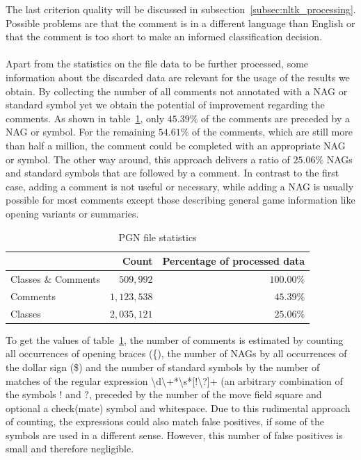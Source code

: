 \documentclass[article,type=msc,colorback,accentcolor=tud7b]{tudthesis}
\begin{document}
    The last criterion quality will be discussed in subsection~\ref{subsec:nltk_processing}. Possible problems are that the comment is in a different language than English or that the comment is too short to make an informed classification decision. \\\\
    Apart from the statistics on the file data to be further processed, some information about the discarded data are relevant for the usage of the results we obtain. By collecting the number of all comments not annotated with a NAG or standard symbol yet we obtain the potential of improvement regarding the comments. As shown in table~\ref{tab:file_statistics}, only $45.39\%$ of the comments are preceded by a NAG or symbol. For the remaining $54.61\%$ of the comments, which are still more than half a million, the comment could be completed with an appropriate NAG or symbol. The other way around, this approach delivers a ratio of $25.06\%$ NAGs and standard symbols that are followed by a comment. In contrast to the first case, adding a comment is not useful or necessary, while adding a NAG is usually possible for most comments except those describing general game information like opening variants or summaries.
	
	\begin{table}[H]
      \begin{tabular}{| l | r | r |}
    	\hline
    	 & Count & Percentage of processed data \\ \hline
    	Classes \& Comments & $509,992$ & $100.00\%$ \\ \hline
    	Comments & $1,123,538$ & $45.39\%$ \\ \hline
    	Classes & $2,035,121$ & $25.06\%$ \\ \hline
      \end{tabular}
      \caption{PGN file statistics}
      \label{tab:file_statistics}
	\end{table}
	
    To get the values of table~\ref{tab:file_statistics}, the number of comments is estimated by counting all occurrences of opening braces (\{), the number of NAGs by all occurrences of the dollar sign (\$) and the number of standard symbols by the number of matches of the regular expression \textbackslash d\textbackslash+*\textbackslash s*[!\textbackslash?]+ (an arbitrary combination of the symbols $!$ and $?$, preceded by the number of the move field square and optional a check(mate) symbol and whitespace. Due to this rudimental approach of counting, the expressions could also match false positives, if some of the symbols are used in a different sense. However, this number of false positives is small and therefore negligible.	
\end{document}

